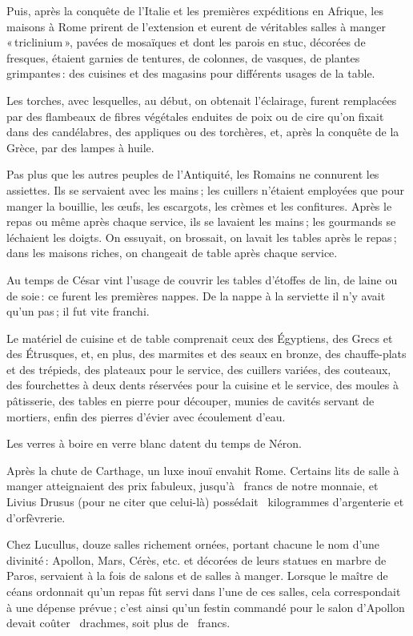 Puis, après la conquête de l'Italie et les premières expéditions en Afrique,
les maisons à Rome prirent de l'extension et eurent de véritables salles
à manger « triclinium », pavées de mosaïques et dont les parois en stuc,
décorées de fresques, étaient garnies de tentures, de colonnes, de vasques, de
plantes grimpantes : des cuisines et des magasins pour différents usages de la
table.

Les torches, avec lesquelles, au début, on obtenait l'éclairage, furent remplacées
par des flambeaux de fibres végétales enduites de poix ou de cire qu'on fixait
dans des candélabres, des appliques ou des torchères, et, après la conquête de la
Grèce, par des lampes à huile.

Pas plus que les autres peuples de l'Antiquité, les Romains ne connurent les
assiettes. Ils se servaient avec les mains ; les cuillers n'étaient employées
que pour manger la bouillie, les œufs, les escargots, les crèmes et les
confitures. Après le repas ou même après chaque service, ils se lavaient les
mains ; les gourmands se léchaient les doigts. On essuyait, on brossait, on
lavait les tables après le repas ; dans les maisons riches, on changeait de
table après chaque service.

Au temps de César vint l'usage de couvrir les tables d'étoffes de lin, de laine
ou de soie : ce furent les premières nappes. De la nappe à la serviette il
n'y avait qu'un pas ; il fut vite franchi.

Le matériel de cuisine et de table comprenait ceux des Égyptiens, des Grecs et
des Étrusques, et, en plus, des marmites et des seaux en bronze, des
chauffe-plats et des trépieds, des plateaux pour le service, des cuillers
variées, des couteaux, des fourchettes à deux dents réservées pour la cuisine
et le service, des moules à pâtisserie, des tables en pierre pour découper,
munies de cavités servant de mortiers, enfin des pierres d'évier avec
écoulement d'eau.

Les verres à boire en verre blanc datent du temps de Néron.

Après la chute de Carthage, un luxe inouï envahit Rome. Certains lits de salle
à manger atteignaient des prix fabuleux, jusqu'à {\mmm} {\mmm}
francs de notre monnaie, et Livius Drusus (pour ne citer que celui-là)
possédait {\mmm} {\mmm} kilogrammes d'argenterie et d'orfèvrerie.

Chez Lucullus, douze salles richement ornées, portant chacune le nom d'une
divinité : Apollon, Mars, Cérès, etc. et décorées de leurs statues en marbre de
Paros, servaient à la fois de salons et de salles à manger. Lorsque le maître
de céans ordonnait qu'un repas fût servi dans l’une de ces salles, cela
correspondait à une dépense prévue ; c'est ainsi qu'un festin commandé pour le
salon d'Apollon devait coûter {\mmm} {\mmm} drachmes, soit plus de
{\mmm} {\mmm} francs.

